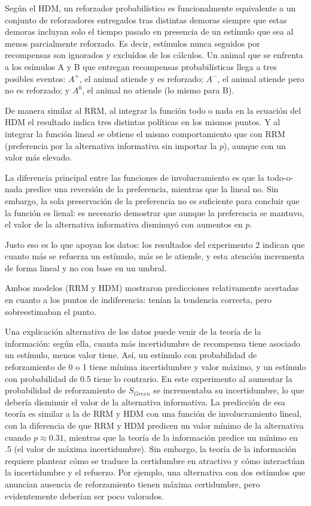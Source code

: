 \documentclass[a4paper,12pt]{article}
\begin{document}
Según el HDM, un reforzador probabilístico es funcionalmente equivalente a un conjunto de reforzadores entregados tras distintas demoras siempre que estas demoras incluyan solo el tiempo pasado en presencia de un estímulo que sea al menos parcialmente reforzado. Es decir, estímulos nunca seguidos por recompensas son ignorados y excluídos de los cálculos. Un animal que se enfrenta a los esímulos A y B que entregan recompensas probabilísticas llega a tres posibles eventos: $A^+$, el animal atiende y es reforzado; $A^-$, el animal atiende pero no es reforzado; y $A^0$, el animal no atiende (lo mismo para B).

De manera similar al RRM, al integrar la función todo o nada en la ecuación del HDM el resultado indica tres distintas políticas en los mismos puntos. Y al integrar la función lineal se obtiene el mismo comportamiento que con RRM (preferencia por la alternativa informativa sin importar la $p$), aunque con un valor más elevado.

La diferencia principal entre las funciones de involucramiento es que la todo-o-nada predice una reversión de la preferencia, mientras que la lineal no. Sin embargo, la sola preservación de la preferencia no es suficiente para concluir que la función es lienal: es necesario demostrar que aunque la preferencia se mantuvo, el valor de la alternativa informativa disminuyó con aumentos en $p$.

Justo eso es lo que apoyan los datos: los resultados del experimento 2 indican que cuanto más se refuerza un estímulo, más se le atiende, y esta atención incrementa de forma lineal y no con base en un umbral.

Ambos modelos (RRM y HDM) mostraron predicciones relativamente acertadas en cuanto a los puntos de indiferencia: tenían la tendencia correcta, pero sobreestimaban el punto.

Una explicación alternativa de los datos puede venir de la teoría de la información: según ella, cuanta más incertidumbre de recompensa tiene asociado un estímulo, menos valor tiene. Así, un estímulo con probabilidad de reforzamiento de 0 o 1 tiene mínima incertidumbre y valor máximo, y un estímulo con probabilidad de 0.5 tiene lo contrario. En este experimento al aumentar la probabilidad de reforzamiento de $S_{Green}$ se incrementaba su incertidumbre, lo que debería disminuir el valor de la alternativa informativa. La predicción de esa teoría es similar a la de RRM y HDM con una función de involucramiento lineal, con la diferencia de que RRM y HDM predicen un valor mínimo de la alternativa cuando $p \approx 0{.}31$, mientras que la teoría de la información predice un mínimo en .5 (el valor de máxima incertidumbre). Sin embargo, la teoría de la información requiere plantear cómo se traduce la certidumbre en atractivo y cómo interactúan la incertidumbre y el refuerzo. Por ejemplo, una alternativa con dos estímulos que anuncian ausencia de reforzamiento tienen máxima certidumbre, pero evidentemente deberían ser poco valorados.
\end{document}
